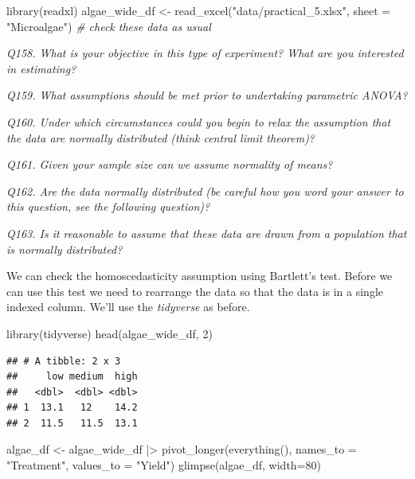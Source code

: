 \documentclass[
  11pt,
  a4paper,
]{book}
\newenvironment{Shaded}{\begin{snugshade}}{\end{snugshade}}
\newcommand{\AttributeTok}[1]{\textcolor[rgb]{0.77,0.63,0.00}{#1}}
\newcommand{\CommentTok}[1]{\textcolor[rgb]{0.56,0.35,0.01}{\textit{#1}}}
\newcommand{\DecValTok}[1]{\textcolor[rgb]{0.00,0.00,0.81}{#1}}
\newcommand{\FunctionTok}[1]{\textcolor[rgb]{0.00,0.00,0.00}{#1}}
\newcommand{\NormalTok}[1]{#1}
\newcommand{\OtherTok}[1]{\textcolor[rgb]{0.56,0.35,0.01}{#1}}
\newcommand{\SpecialCharTok}[1]{\textcolor[rgb]{0.00,0.00,0.00}{#1}}
\newcommand{\StringTok}[1]{\textcolor[rgb]{0.31,0.60,0.02}{#1}}
\begin{document}
\begin{Shaded}
\begin{Highlighting}[]
\FunctionTok{library}\NormalTok{(readxl)}
\NormalTok{algae\_wide\_df }\OtherTok{\textless{}{-}} \FunctionTok{read\_excel}\NormalTok{(}\StringTok{"data/practical\_5.xlsx"}\NormalTok{, }\AttributeTok{sheet =} \StringTok{"Microalgae"}\NormalTok{)}
\CommentTok{\# check these data as usual}
\end{Highlighting}
\end{Shaded}

\emph{Q158. What is your objective in this type of experiment? What are you interested in estimating?}

\emph{Q159. What assumptions should be met prior to undertaking parametric ANOVA?}

\emph{Q160. Under which circumstances could you begin to relax the assumption that the data are normally distributed (think central limit theorem)?}

\emph{Q161. Given your sample size can we assume normality of means?}

\emph{Q162. Are the data normally distributed (be careful how you word your answer to this question, see the following question)?}

\emph{Q163. Is it reasonable to assume that these data are drawn from a population that is normally distributed?}

We can check the homoscedasticity assumption using Bartlett's test. Before we can use this test we need to rearrange the data so that the data is in a single indexed column. We'll use the \emph{tidyverse} as before.

\begin{Shaded}
\begin{Highlighting}[]
\FunctionTok{library}\NormalTok{(tidyverse)}
\FunctionTok{head}\NormalTok{(algae\_wide\_df, }\DecValTok{2}\NormalTok{)}
\end{Highlighting}
\end{Shaded}

\begin{verbatim}
## # A tibble: 2 x 3
##     low medium  high
##   <dbl>  <dbl> <dbl>
## 1  13.1   12    14.2
## 2  11.5   11.5  13.1
\end{verbatim}

\begin{Shaded}
\begin{Highlighting}[]
\NormalTok{algae\_df }\OtherTok{\textless{}{-}}\NormalTok{ algae\_wide\_df }\SpecialCharTok{|\textgreater{}}
  \FunctionTok{pivot\_longer}\NormalTok{(}\FunctionTok{everything}\NormalTok{(), }\AttributeTok{names\_to =} \StringTok{"Treatment"}\NormalTok{, }\AttributeTok{values\_to =} \StringTok{"Yield"}\NormalTok{)}
\FunctionTok{glimpse}\NormalTok{(algae\_df, }\AttributeTok{width=}\DecValTok{80}\NormalTok{)}
\end{Highlighting}
\end{Shaded}
\end{document}
